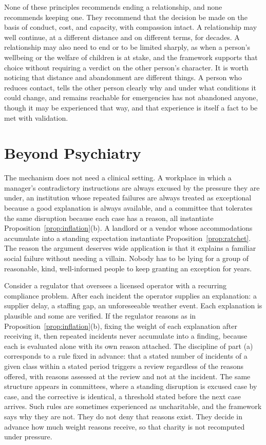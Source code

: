 \documentclass[11pt]{article}
\theoremstyle{definition}
\theoremstyle{remark}
\begin{document}
None of these principles recommends ending a relationship, and none recommends keeping one. They recommend that the decision be made on the basis of conduct, cost, and capacity, with compassion intact. A relationship may well continue, at a different distance and on different terms, for decades. A relationship may also need to end or to be limited sharply, as when a person's wellbeing or the welfare of children is at stake, and the framework supports that choice without requiring a verdict on the other person's character. It is worth noticing that distance and abandonment are different things. A person who reduces contact, tells the other person clearly why and under what conditions it could change, and remains reachable for emergencies has not abandoned anyone, though it may be experienced that way, and that experience is itself a fact to be met with validation.

\section{Beyond Psychiatry}\label{sec:beyond}

The mechanism does not need a clinical setting. A workplace in which a manager's contradictory instructions are always excused by the pressure they are under, an institution whose repeated failures are always treated as exceptional because a good explanation is always available, and a committee that tolerates the same disruption because each case has a reason, all instantiate Proposition~\ref{prop:inflation}(b). A landlord or a vendor whose accommodations accumulate into a standing expectation instantiate Proposition~\ref{prop:ratchet}. The reason the argument deserves wide application is that it explains a familiar social failure without needing a villain. Nobody has to be lying for a group of reasonable, kind, well-informed people to keep granting an exception for years.

Consider a regulator that oversees a licensed operator with a recurring compliance problem. After each incident the operator supplies an explanation: a supplier delay, a staffing gap, an unforeseeable weather event. Each explanation is plausible and some are verified. If the regulator reasons as in Proposition~\ref{prop:inflation}(b), fixing the weight of each explanation after receiving it, then repeated incidents never accumulate into a finding, because each is evaluated alone with its own reason attached. The discipline of part (a) corresponds to a rule fixed in advance: that a stated number of incidents of a given class within a stated period triggers a review regardless of the reasons offered, with reasons assessed at the review and not at the incident. The same structure appears in committees, where a standing disruption is excused case by case, and the corrective is identical, a threshold stated before the next case arrives. Such rules are sometimes experienced as uncharitable, and the framework says why they are not. They do not deny that reasons exist. They decide in advance how much weight reasons receive, so that charity is not recomputed under pressure.
\end{document}
